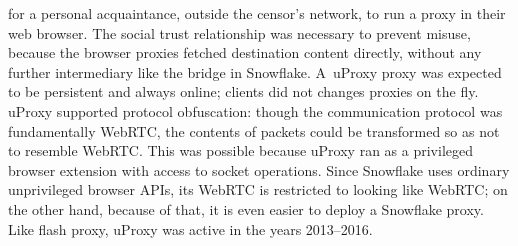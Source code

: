 \documentclass[letterpaper,twocolumn]{article}
\begin{document}
for a personal acquaintance, outside the censor's network,
to run a proxy in their web browser.
The social trust relationship was necessary to prevent misuse,
because the browser proxies fetched destination content directly,
without any further intermediary like the bridge in Snowflake.
A~uProxy proxy was expected to be
persistent and always online;
clients did not changes proxies on the fly.
uProxy supported protocol obfuscation:
though the communication protocol was fundamentally WebRTC,
the contents of packets could be transformed so as not to resemble WebRTC.
This was possible because uProxy ran as a privileged browser extension
with access to socket operations.
Since Snowflake uses ordinary unprivileged browser APIs,
its WebRTC is restricted to looking like WebRTC;
on the other hand, because of that,
it is even easier to deploy a Snowflake proxy.
Like flash proxy, uProxy was active in the years
2013--2016.
\end{document}
